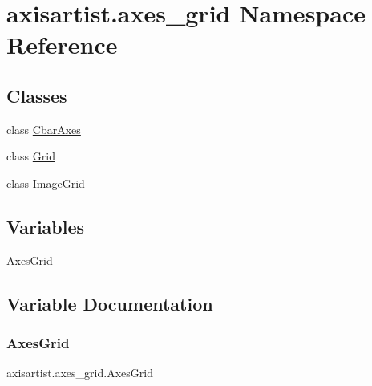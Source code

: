 \hypertarget{namespaceaxisartist_1_1axes__grid}{}\section{axisartist.\+axes\+\_\+grid Namespace Reference}
\label{namespaceaxisartist_1_1axes__grid}
\subsection*{Classes}
\begin{DoxyCompactItemize}
\item 
class \hyperlink{classaxisartist_1_1axes__grid_1_1CbarAxes}{Cbar\+Axes}
\item 
class \hyperlink{classaxisartist_1_1axes__grid_1_1Grid}{Grid}
\item 
class \hyperlink{classaxisartist_1_1axes__grid_1_1ImageGrid}{Image\+Grid}
\end{DoxyCompactItemize}
\subsection*{Variables}
\begin{DoxyCompactItemize}
\item 
\hyperlink{namespaceaxisartist_1_1axes__grid_ad550c6ab48db845bb531b0d2415c9619}{Axes\+Grid}
\end{DoxyCompactItemize}


\subsection{Variable Documentation}
\mbox{\label{namespaceaxisartist_1_1axes__grid_ad550c6ab48db845bb531b0d2415c9619}} 
\subsubsection{\texorpdfstring{Axes\+Grid}{AxesGrid}}
{\footnotesize\ttfamily axisartist.\+axes\+\_\+grid.\+Axes\+Grid}

